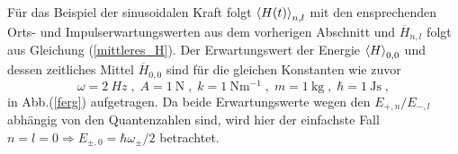     Für das Beispiel der sinusoidalen Kraft folgt $\braket{H(t)}_{n,l}$ mit den ensprechenden Orts- und Impulserwartungswerten aus dem vorherigen Abschnitt und  $\overline{H}_{n,l}$ folgt aus Gleichung (\ref{mittleres_H}).
    Der Erwartungswert der Energie $\braket H_{0,0}$ und dessen zeitliches Mittel $\overline{H}_{0,0}$ sind für die gleichen Konstanten wie zuvor
    \begin{equation}
      \omega=\SI{2}{Hz} \;,\; A=\SI{1}{\newton} \;,\; k=\SI{1}{\newton \meter^{-1}} \;,\; m=\SI{1}{\kilo \gram} \;,\; \hbar=\SI{1}{\joule \second}  \; ,
    \end{equation}
    in Abb.(\ref{ferg}) aufgetragen.
    Da beide Erwartungswerte wegen den $E_{+,n}/E_{-,l}$ abhängig von den Quantenzahlen sind, wird hier der einfachste Fall $n=l=0 \Rightarrow E_{\pm,0}=\hbar \omega_\pm/2$ betrachtet.
\iffalse
